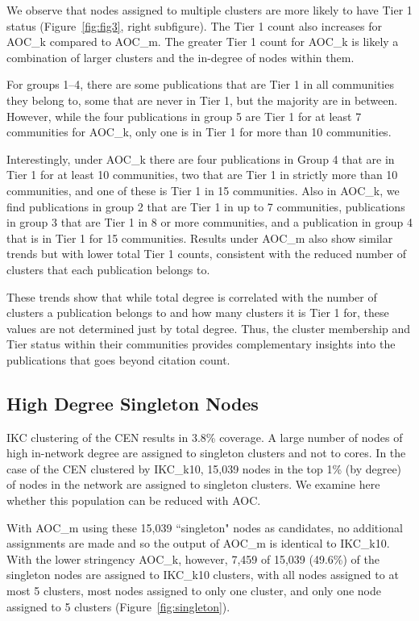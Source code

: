 \documentclass[12pt, oneside]{article}   	%
\begin{document}
We observe that nodes assigned to multiple clusters are more likely to have Tier 1 status (Figure~\ref{fig:fig3}, right subfigure). The Tier 1 count also increases for AOC\_k compared to AOC\_m. 
The greater Tier 1 count for AOC\_k is likely a combination of larger clusters and the in-degree of nodes within them.

For groups 1--4, there are some publications that are Tier 1 in all communities they belong to, some that are never in Tier 1, but the majority are in between. 
However, while the four publications in group 5 are Tier 1 for at least 7 communities for AOC\_k, only one is in Tier 1 for more than 10 communities. 

Interestingly, under AOC\_k there are four publications in Group 4 that are in Tier 1 for at least 10 communities, two that are Tier 1 in strictly more than 10 communities, and one of these is Tier 1 in 15 communities. Also in AOC\_k, we find publications in group 2 that are Tier 1 in up to 7 communities, publications in group 3 that are Tier 1 in 8 or more communities, and a publication in group 4 that is in Tier 1 for 15 communities. Results under AOC\_m also show similar trends but with lower total Tier 1 counts, consistent with the reduced number of clusters that each publication belongs to.
	
These trends show that while total degree is correlated with the number of clusters a publication belongs to and how many clusters it is Tier 1 for,
these values are not determined just by total degree. Thus, the cluster membership and Tier status within their communities provides complementary insights into  the publications that goes beyond citation count.
	
\subsection{High Degree Singleton Nodes} 
	
IKC clustering of the CEN results in 3.8\% coverage. A large number of nodes of high in-network degree are assigned to singleton clusters and not to cores. In the case of the CEN clustered by IKC\_k10, 15,039 nodes in the top 1\% (by degree) of nodes in the network are assigned to singleton clusters. We examine here whether this population can be reduced with AOC. 


With AOC\_m using these 15,039  ``singleton" nodes as candidates, no additional assignments are made and so the output of AOC\_m is identical to IKC\_k10. 
With the lower stringency AOC\_k, however, 7,459 of 15,039 (49.6\%) of the singleton nodes are assigned to IKC\_k10 clusters, with all nodes assigned to at most 5 clusters, most nodes assigned to only one cluster, and only one node assigned to 5 clusters (Figure~\ref{fig:singleton}). 
\end{document}
